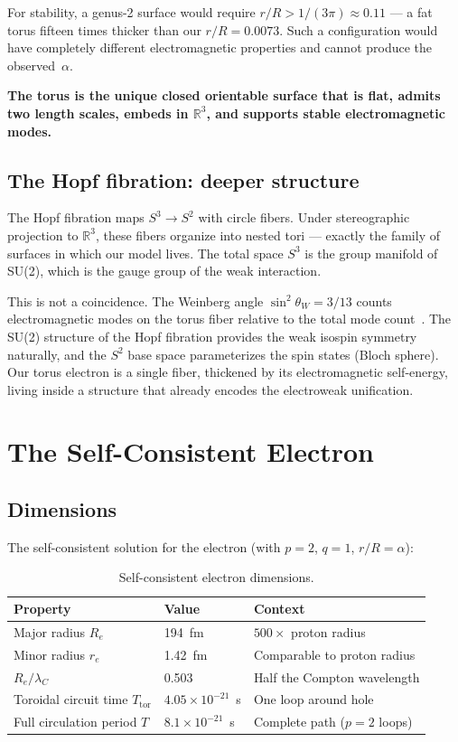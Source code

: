 \documentclass[11pt,a4paper]{article}
\begin{document}
For stability, a genus-2 surface would require $r/R > 1/(3\pi) \approx 0.11$ --- a fat torus fifteen times thicker than our $r/R = 0.0073$. Such a configuration would have completely different electromagnetic properties and cannot produce the observed~$\alpha$.

\textbf{The torus is the unique closed orientable surface that is flat, admits two length scales, embeds in $\mathbb{R}^3$, and supports stable electromagnetic modes.}

\subsection{The Hopf fibration: deeper structure}

The Hopf fibration maps $S^3 \to S^2$ with circle fibers. Under stereographic projection to $\mathbb{R}^3$, these fibers organize into nested tori --- exactly the family of surfaces in which our model lives. The total space $S^3$ is the group manifold of SU(2), which is the gauge group of the weak interaction.

This is not a coincidence. The Weinberg angle $\sin^2\theta_W = 3/13$ counts electromagnetic modes on the torus fiber relative to the total mode count~\cite{paper1}. The SU(2) structure of the Hopf fibration provides the weak isospin symmetry naturally, and the $S^2$ base space parameterizes the spin states (Bloch sphere). Our torus electron is a single fiber, thickened by its electromagnetic self-energy, living inside a structure that already encodes the electroweak unification.

\section{The Self-Consistent Electron}
\label{sec:self-consistent}

\subsection{Dimensions}

The self-consistent solution for the electron (with $p = 2$, $q = 1$, $r/R = \alpha$):

\begin{table}[h]
\centering
\begin{tabular}{@{}lll@{}}
\toprule
Property & Value & Context \\
\midrule
Major radius $R_e$ & 194~fm & $500\times$ proton radius \\
Minor radius $r_e$ & 1.42~fm & Comparable to proton radius \\
$R_e / \lambda_C$ & 0.503 & Half the Compton wavelength \\
Toroidal circuit time $T_{\text{tor}}$ & $4.05 \times 10^{-21}$~s & One loop around hole \\
Full circulation period $T$ & $8.1 \times 10^{-21}$~s & Complete path ($p = 2$ loops) \\
\bottomrule
\end{tabular}
\caption{Self-consistent electron dimensions.}
\label{tab:dimensions}
\end{table}
\end{document}
